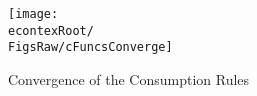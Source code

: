\begin{figure}[tbp]
\centerline{\texttt{[image: \\econtexRoot/\\FigsRaw/cFuncsConverge]}}
\caption{Convergence of the Consumption Rules}
\label{fig:cFuncsConverge}
\end{figure}
